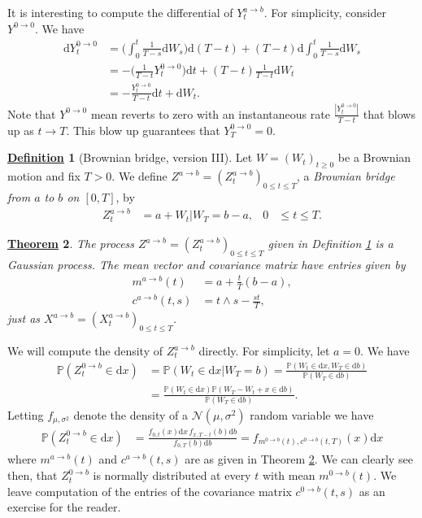 \documentclass[12pt]{book}
\numberwithin{equation}{chapter}
\theoremstyle{plain}
\newtheorem{theorem}{\underline{Theorem}}
\numberwithin{theorem}{section}
\theoremstyle{definition}
\newtheorem{definition}[theorem]{\underline{Definition}}
\numberwithin{exercise}{chapter}
\let\oldendproof\endproof
\renewenvironment{proof}[1][\proofname]{%
  \oldproof[\scshape\underline{#1}]%
}{\oldendproof}
\newcommand{\<}{\langle}
\renewcommand{\>}{\rangle}
\renewcommand{\(}{\left(}
\renewcommand{\)}{\right)}
\renewcommand{\[}{\left[}
\renewcommand{\]}{\right]}
\newcommand\Pb{\mathds{P}}
\newcommand\Nc{\mathscr{N}}
\newcommand\sig{\sigma}
\newcommand\dd{\mathrm{d}}
\begin{document}
\noindent
It is interesting to compute the differential of $Y_t^{a \to b}$.  For simplicity, consider $Y^{0 \to 0}$.  We have
\begin{align}
\dd Y_t^{0 \to 0}
	&=	 \Big( \int_0^t \frac{1}{T-s} \dd W_s \Big) \dd(T- t) + (T-t) \dd \int_0^t \frac{1}{T-s} \dd W_s \\
	&=	- \Big( \frac{1}{T-t} Y_t^{0 \to 0} \Big) \dd t + (T-t) \frac{1}{T-t} \dd W_t \\
	&=	- \frac{Y_t^{0 \to 0}}{T-t} \dd t + \dd W_t .
\end{align}
Note that $Y^{0 \to 0}$ mean reverts to zero with an instantaneous rate $\frac{|Y_t^{0 \to 0}|}{T-t}$ that blows up as $t \to T$.  This blow up guarantees that $Y_T^{0 \to 0} = 0$.

\begin{definition}[Brownian bridge, version III]
\label{def:bridge.bm.3}
Let $W=(W_t)_{t \geq 0}$ be a Brownian motion and fix $T>0$.  We define $Z^{a \to b} = (Z_t^{a \to b})_{0 \leq t \leq T}$, a \emph{Brownian bridge from $a$ to $b$ on $[0,T]$}, by
\begin{align}
Z_t^{a \to b}
	&=	a + W_t | W_T = b -a , &
0
	&\leq t \leq T . \label{eq:Z.ab}
\end{align}
\end{definition}

\begin{theorem}
\label{thm:Z.bridge}
The process $Z^{a \to b} = (Z_t^{a \to b})_{0 \leq t \leq T}$ given in Definition \ref{def:bridge.bm.3} is a Gaussian process.  The mean vector and covariance matrix have entries given by
\begin{align}
m^{a \to b}(t)
	&=	a + \frac{t}{T}(b-a) , \\
c^{a \to b}(t,s)
	&=	t \wedge s - \frac{s t}{T} ,
\end{align}
just as $X^{a \to b} = (X_t^{a \to b})_{0 \leq t \leq T}$.
\end{theorem}

\begin{proof}
We will compute the density of $Z_t^{a \to b}$ directly.  For simplicity, let $a=0$.  We have
\begin{align}
\Pb( Z_t^{0 \to b} \in \dd x )
	&=	\Pb( W_t \in \dd x | W_T = b)
	=		\frac{\Pb( W_t \in \dd x , W_T \in \dd b)}{\Pb(W_T \in \dd b)} \\
	&=		\frac{\Pb( W_t \in \dd x ) \Pb(W_T - W_t + x \in \dd b)}{\Pb(W_T \in \dd b)} .		
\end{align}
Letting $f_{\mu,\sig^2}$ denote the density of a $\Nc(\mu,\sig^2)$ random variable we have
\begin{align}
\Pb( Z_t^{0 \to b} \in \dd x )
	&=	\frac{f_{0,t}(x)\dd x \, f_{x,T-t}(b) \dd b}{f_{0,T}(b) \dd b} 
	 =	f_{m^{0 \to b}(t),c^{0 \to b}(t,T)}(x) \dd x
\end{align}
where $m^{a \to b}(t)$ and $c^{a \to b}(t,s)$ are as given in Theorem \ref{thm:Z.bridge}.  We can clearly see then, that $Z_t^{0 \to b}$ is normally distributed at every $t$ with mean $m^{0 \to b}(t)$.  We leave computation of the entries of the covariance matrix $c^{0 \to b}(t,s)$ as an exercise for the reader.
\end{proof}
\end{document}
